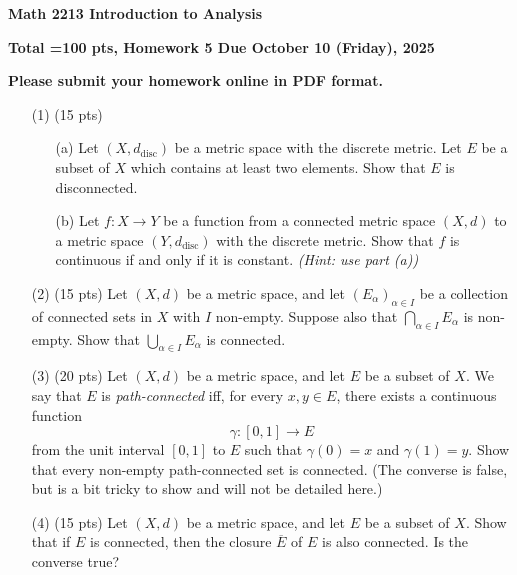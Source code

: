\documentclass[12pt]{amsart}
\theoremstyle{definition}
\theoremstyle{remark}
\begin{document}
\begin{CJK}{UTF8}{bkai}

{\centerline{\bf Math 2213 Introduction to Analysis  }}

{\centerline{\bf Total =100 pts, Homework 5  Due  October 10  (Friday), 2025}}

{\centerline{\bf Please submit your homework online in PDF format.}}


 
\begin{enumerate}

\item[(1)]  (15 pts)  

  
  \begin{enumerate}
  \item[(a)] Let $(X,d_{\mathrm{disc}})$ be a metric space with the discrete metric.  
Let $E$ be a subset of $X$ which contains at least two elements.  
Show that $E$ is disconnected.

\medskip
\item[(b)] 
Let $f : X \to Y$ be a function from a connected metric space $(X,d)$ to a metric space $(Y,d_{\mathrm{disc}})$ with the discrete metric.  
Show that $f$ is continuous if and only if it is constant.  
\emph{(Hint: use part (a))}
 
  \end{enumerate}


\bigskip
\vfill


\item[(2)]  (15 pts) 
Let $(X,d)$ be a metric space, and let $(E_\alpha)_{\alpha\in I}$ be a collection of connected sets in $X$ with $I$ non-empty.  
Suppose also that $\bigcap_{\alpha\in I} E_\alpha$ is non-empty.  
Show that $\bigcup_{\alpha\in I} E_\alpha$ is connected.
\vfill
\bigskip

\item[(3)]  (20 pts) 	
Let $(X,d)$ be a metric space, and let $E$ be a subset of $X$.  
We say that $E$ is \emph{path-connected} iff, for every $x,y \in E$, there exists a continuous function  
\[
\gamma : [0,1] \to E
\]
from the unit interval $[0,1]$ to $E$ such that $\gamma(0)=x$ and $\gamma(1)=y$.  
Show that every non-empty path-connected set is connected.  
(The converse is false, but is a bit tricky to show and will not be detailed here.)

\vfill
\bigskip

\item[(4)]  (15 pts) Let $(X,d)$ be a metric space, and let $E$ be a subset of $X$.  
Show that if $E$ is connected, then the closure $\overline{E}$ of $E$ is also connected.  
Is the converse true?
 

\end{enumerate}
\end{CJK}
\end{document}
